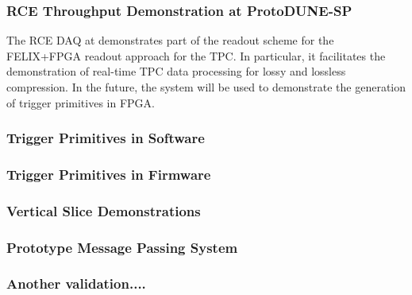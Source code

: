 \subsubsection{RCE Throughput Demonstration at ProtoDUNE-SP}
\label{sec:sp-daq:validation-pdune-rce}

The RCE DAQ at  demonstrates part of the readout scheme for
the FELIX+FPGA readout approach for the TPC. In particular, it
facilitates the demonstration of real-time TPC data processing for lossy
and lossless compression. In the future, the system will be used
to demonstrate the generation of trigger primitives in FPGA.

\subsubsection{Trigger Primitives in Software}
\label{sec:sp-daq:validation-software-trigger-primitives}
 


\subsubsection{Trigger Primitives in Firmware}
\label{sec:sp-daq:validation-firmware-trigger-primitives}


\subsubsection{Vertical Slice Demonstrations}
\label{sec:sp-daq:validation-demonstrators}


\subsubsection{Prototype Message Passing System}
\label{sec:fd-daq:validation-demonstrators}


\subsubsection{Another validation....}

